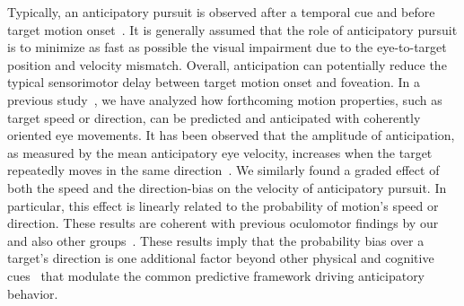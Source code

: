 \documentclass[10pt,letterpaper]{article}
\newcommand{\citep}[1]{\cite{#1}}
\newcommand{\seeFig}[1]{Figure~\ref{fig:#1}}
\begin{document}
Typically, an anticipatory pursuit is observed after a temporal cue and
before target motion onset~\citep{Kowler1979a,Kowler1979b, Kowler1984}. %
It is generally assumed that the role of anticipatory pursuit is
to minimize as fast as possible the visual impairment due
to the eye-to-target position and velocity mismatch.
Overall, anticipation can potentially reduce the typical sensorimotor delay
between target motion onset and foveation. In a previous study~\citep{Montagnini2010},
we have analyzed how forthcoming motion properties,
such as target speed or direction, can be
predicted and anticipated with coherently oriented eye movements. %
It has been observed that the amplitude of anticipation,
as measured by the mean anticipatory eye velocity,
increases when the target repeatedly moves in the same direction~\citep{Kowler1984, Kowler1989, Heinen2005}.
We similarly found a graded effect of both the speed and the direction-bias
on the velocity of anticipatory pursuit. %
In particular, this effect is linearly related
to the probability of motion's speed or direction. %
These results are coherent with previous oculomotor findings
by our and also other groups~\citep{SantosKowler2017}.
These results imply that the probability bias over a target's direction is
one additional factor beyond other physical and cognitive cues~\citep{Kowler2014, SantosKowler2017,Damasse18}
that modulate the common predictive framework
driving anticipatory behavior.
%
\end{document}
